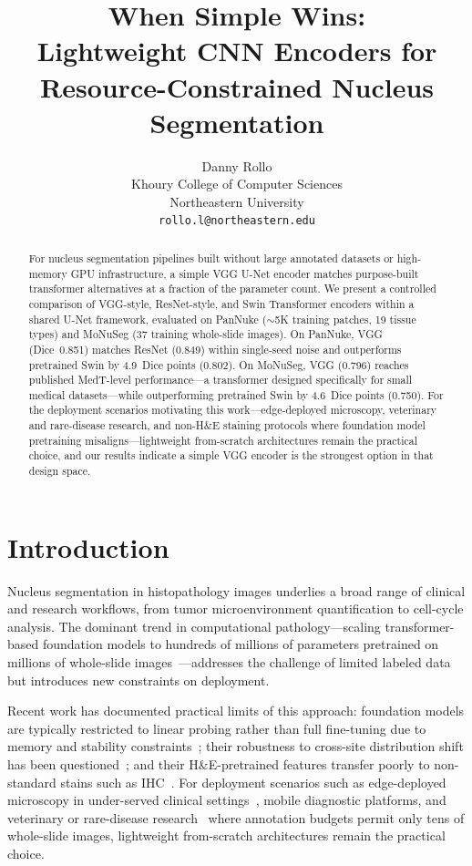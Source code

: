 \documentclass{article}
\title{When Simple Wins:\\Lightweight CNN Encoders for Resource-Constrained Nucleus Segmentation}
\author{
  Danny Rollo \\
  Khoury College of Computer Sciences\\
  Northeastern University\\
  \texttt{rollo.l@northeastern.edu}
}
\begin{document}
\maketitle

\begin{abstract}
For nucleus segmentation pipelines built without large annotated datasets or high-memory GPU infrastructure, a simple VGG U-Net encoder matches purpose-built transformer alternatives at a fraction of the parameter count. We present a controlled comparison of VGG-style, ResNet-style, and Swin Transformer encoders within a shared U-Net framework, evaluated on PanNuke (${\sim}$5K training patches, 19 tissue types) and MoNuSeg (37 training whole-slide images). On PanNuke, VGG (Dice~0.851) matches ResNet (0.849) within single-seed noise and outperforms pretrained Swin by 4.9~Dice points (0.802). On MoNuSeg, VGG (0.796) reaches published MedT-level performance---a transformer designed specifically for small medical datasets---while outperforming pretrained Swin by 4.6~Dice points (0.750). For the deployment scenarios motivating this work---edge-deployed microscopy, veterinary and rare-disease research, and non-H\&E staining protocols where foundation model pretraining misaligns---lightweight from-scratch architectures remain the practical choice, and our results indicate a simple VGG encoder is the strongest option in that design space.
\end{abstract}

\section{Introduction}

Nucleus segmentation in histopathology images underlies a broad range of clinical and research workflows, from tumor microenvironment quantification to cell-cycle analysis. The dominant trend in computational pathology---scaling transformer-based foundation models to hundreds of millions of parameters pretrained on millions of whole-slide images~\cite{chen2024uni, vorontsov2024virchow}---addresses the challenge of limited labeled data but introduces new constraints on deployment.

Recent work has documented practical limits of this approach: foundation models are typically restricted to linear probing rather than full fine-tuning due to memory and stability constraints~\cite{tizhoosh2025why, campanella2025clinical}; their robustness to cross-site distribution shift has been questioned~\cite{dejong2025current}; and their H\&E-pretrained features transfer poorly to non-standard stains such as IHC~\cite{hua2024pathoduet}. For deployment scenarios such as edge-deployed microscopy in under-served clinical settings~\cite{salido2025realtime}, mobile diagnostic platforms, and veterinary or rare-disease research~\cite{xiao2025review} where annotation budgets permit only tens of whole-slide images, lightweight from-scratch architectures remain the practical choice.
\end{document}

